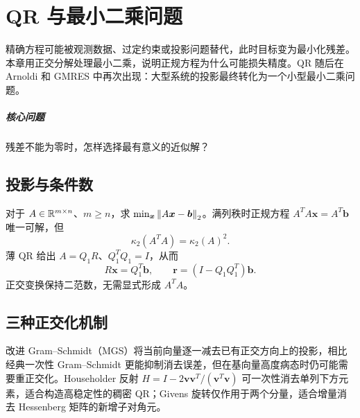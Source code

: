 \chapter{QR 与最小二乘问题}\label{v0ch:7}
\begin{chaptersummary}
精确方程可能被观测数据、过定约束或投影问题替代，此时目标变为最小化残差。本章用正交分解处理最小二乘，说明正规方程为什么可能损失精度。QR 随后在 Arnoldi 和 GMRES 中再次出现：大型系统的投影最终转化为一个小型最小二乘问题。
\end{chaptersummary}
\paragraph{核心问题}残差不能为零时，怎样选择最有意义的近似解？

\section{投影与条件数}
对于 $A\in\mathbb R^{m\times n}$、$m\ge n$，求 $\min_{\bm x}\left\lVert A\bm x-\bm b\right\rVert_2$。满列秩时正规方程
$A^TA\bm x=A^T\bm b$ 唯一可解，但
\[
 \kappa_2(A^TA)=\kappa_2(A)^2.
\]
薄 QR 给出 $A=Q_1R$、$Q_1^TQ_1=I$，从而
\[
 R\bm x=Q_1^T\bm b,\qquad
 \bm r=(I-Q_1Q_1^T)\bm b.
\]
正交变换保持二范数，无需显式形成 $A^TA$。
\section{三种正交化机制}
改进 Gram--Schmidt（MGS）将当前向量逐一减去已有正交方向上的投影，相比经典一次性 Gram--Schmidt 更能抑制消去误差，但在基向量高度病态时仍可能需要重正交化。Householder 反射 $H=I-2\bm v\bm v^T/(\bm v^T\bm v)$ 可一次性消去单列下方元素，适合构造高稳定性的稠密 QR；Givens 旋转仅作用于两个分量，适合增量消去 Hessenberg 矩阵的新增子对角元。

